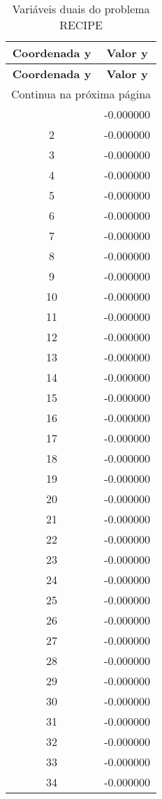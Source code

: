 \documentclass[12pt]{article}
\begin{document}
\begin{longtable}{@{}cc@{}}
\caption{Variáveis duais do problema RECIPE} \\
\toprule
\textbf{Coordenada y} & \textbf{Valor y} \\
\midrule
\endfirsthead

\toprule
\textbf{Coordenada y} & \textbf{Valor y} \\
\midrule
\endhead

\midrule \multicolumn{2}{r}{{Continua na próxima página}} \\ \midrule
\endfoot

\bottomrule
\endlastfoot
1 & -0.000000 \\
2 & -0.000000 \\
3 & -0.000000 \\
4 & -0.000000 \\
5 & -0.000000 \\
6 & -0.000000 \\
7 & -0.000000 \\
8 & -0.000000 \\
9 & -0.000000 \\
10 & -0.000000 \\
11 & -0.000000 \\
12 & -0.000000 \\
13 & -0.000000 \\
14 & -0.000000 \\
15 & -0.000000 \\
16 & -0.000000 \\
17 & -0.000000 \\
18 & -0.000000 \\
19 & -0.000000 \\
20 & -0.000000 \\
21 & -0.000000 \\
22 & -0.000000 \\
23 & -0.000000 \\
24 & -0.000000 \\
25 & -0.000000 \\
26 & -0.000000 \\
27 & -0.000000 \\
28 & -0.000000 \\
29 & -0.000000 \\
30 & -0.000000 \\
31 & -0.000000 \\
32 & -0.000000 \\
33 & -0.000000 \\
34 & -0.000000 \\

\end{longtable}
\end{document}
